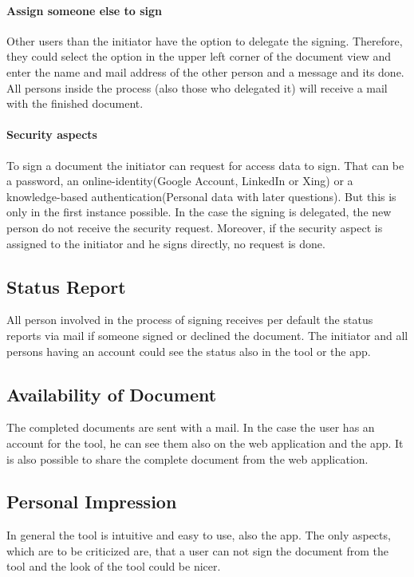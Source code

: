 \paragraph{Assign someone else to sign} Other users than the initiator have the option to delegate the signing. Therefore, they could select the option in the upper left corner of the document view and enter the name and mail address of the other person and a message and its done. All persons inside the process (also those who delegated it) will receive a mail with the finished document.

\paragraph{Security aspects} To sign a document the initiator can request for access data to sign. That can be a password, an online-identity(Google Account, LinkedIn or Xing) or a knowledge-based authentication(Personal data with later questions). But this is only in the first instance possible. In the case the signing is delegated, the new person do not receive the security request. Moreover, if the security aspect is assigned to the initiator and he signs directly, no request is done. 

\subsection{Status Report}
All person involved in the process of signing receives per default the status reports via mail if someone signed or declined the document. The initiator and all persons having an account could see the status also in the tool or the \gls{app}.

\subsection{Availability of Document}
The completed documents are sent with a mail. In the case the user has an account for the tool, he can see them also on the web application and the \gls{app}. It is also possible to share the complete document from the web application.

\subsection{Personal Impression}
In general the tool is intuitive and easy to use, also the \gls{app}. The only aspects, which are to be criticized are, that a user can not sign the document from the tool and the look of the tool could be nicer.